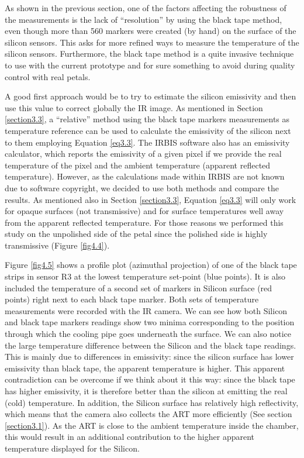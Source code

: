 		As shown in the previous section, one of the factors affecting the robustness of the measurements is the lack of “resolution” by using the black tape method, even though more than 560 markers were created (by hand) on the surface of the silicon sensors. This asks for more refined ways to measure the temperature of the silicon sensors. Furthermore, the black tape method is a quite invasive technique to use with the current prototype and for sure something to avoid during quality control with real petals.
		
		A good first approach would be to try to estimate the silicon emissivity and then use this value to correct globally the IR image. As mentioned in Section \ref{section3.3}, a “relative” method using the black tape markers measurements as temperature reference can be used to calculate the emissivity of the silicon next to them employing Equation \ref{eq3.3}. The IRBIS software also has an emissivity calculator, which reports the emissivity of a given pixel if we provide the real temperature of the pixel and the ambient temperature (apparent reflected temperature). However, as the calculations made within IRBIS are not known due to software copyright, we decided to use both methods and compare the results. As mentioned also in Section \ref{section3.3}, Equation \ref{eq3.3} will only work for opaque surfaces (not transmissive) and for surface temperatures well away from the apparent reflected temperature. For those reasons we performed this study on the unpolished side of the petal since the polished side is highly transmissive (Figure \ref{fig4.4}).
		
		Figure \ref{fig4.5} shows a profile plot (azimuthal projection) of one of the black tape strips in sensor R3 at the lowest temperature set-point (blue points). It is also included the temperature of a second set of markers in Silicon surface (red points) right next to each black tape marker. Both sets of temperature measurements were recorded with the IR camera. 
		We can see how both Silicon and black tape markers readings show two minima corresponding to the position through which the cooling pipe goes underneath the surface. We can also notice the large temperature difference between the Silicon and the black tape readings. This is mainly due to differences in emissivity: since the silicon surface has lower emissivity than black tape, the apparent temperature is higher. This apparent contradiction can be overcome if we think about it this way: since the black tape has higher emissivity, it is therefore better than the silicon at emitting the real (cold) temperature.
		In addition, the Silicon surface has relatively high reflectivity, which means that the camera also collects the ART more efficiently (See section \ref{section3.1}). As the ART is close to the ambient temperature inside the chamber, this would result in an additional contribution to the higher apparent temperature displayed for the Silicon.
		

